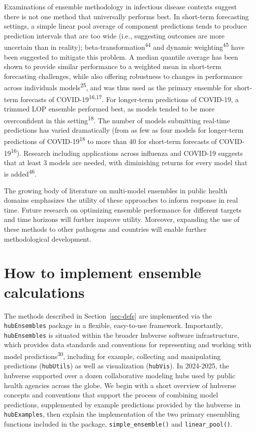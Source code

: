\documentclass[
]{article}
\begin{document}
Examinations of ensemble methodology in infectious disease contexts
suggest there is not one method that universally performs best. In
short-term forecasting settings, a simple linear pool average of
component predictions tends to produce prediction intervals that are too
wide (i.e., suggesting outcomes are more uncertain than in reality);
beta-transformation\textsuperscript{44} and dynamic
weighting\textsuperscript{45} have been suggested to mitigate this
problem. A median quantile average has been shown to provide similar
performance to a weighted mean in short-term forecasting challenges,
while also offering robustness to changes in performance across
individuals models\textsuperscript{25}, and was thus used as the primary
ensemble for short-term forecasts of COVID-19\textsuperscript{16,17}.
For longer-term predictions of COVID-19, a trimmed LOP ensemble
performed best, as models tended to be more overconfident in this
setting\textsuperscript{18}. The number of models submitting real-time
predictions has varied dramatically (from as few as four models for
longer-term predictions of COVID-19\textsuperscript{18} to more than 40
for short-term forecasts of COVID-19\textsuperscript{16}). Research
including applications across influenza and COVID-19 suggests that at
least 3 models are needed, with diminishing returns for every model that
is added\textsuperscript{46}.

The growing body of literature on multi-model ensembles in public health
domains emphasizes the utility of these approaches to inform response in
real time. Future research on optimizing ensemble performance for
different targets and time horizons will further improve utility.
Moreover, expanding the use of these methods to other pathogens and
countries will enable further methodological development.

\section{How to implement ensemble
calculations}\label{sec-implementation}

The methods described in Section~\ref{sec-defs} are implemented via the
\texttt{hubEnsembles} package in a flexible, easy-to-use framework.
Importantly, \texttt{hubEnsembles} is situated within the broader
hubverse software infrastructure, which provides data standards and
conventions for representing and working with model
predictions\textsuperscript{30}, including for example, collecting and
manipulating predictions (\texttt{hubUtils}) as well as visualization
(\texttt{hubVis}). In 2024-2025, the hubverse supported over a dozen
collaborative modeling hubs used by public health agencies across the
globe. We begin with a short overview of hubverse concepts and
conventions that support the process of combining model predictions,
supplemented by example predictions provided by the hubverse in
\texttt{hubExamples}, then explain the implementation of the two primary
ensembling functions included in the package,
\texttt{simple\_ensemble()} and \texttt{linear\_pool()}.
\end{document}
